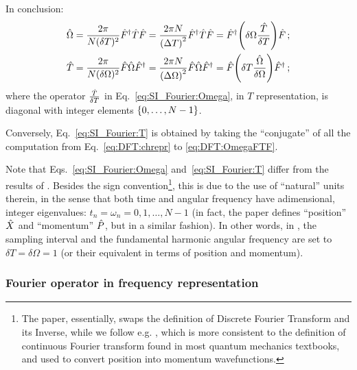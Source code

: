 In conclusion:
\begin{gather}
  \label{eq:SI_Fourier:Omega}
    \hat{\Omega} =
      \frac{2\pi}{N(\delta T)^2}          \hat{F}^{\dagger} \hat{T} \hat{F} =
      \frac{2\pi N}{\qty(\Delta T)^2}     \hat{F}^{\dagger} \hat{T} \hat{F} =
      \hat{F}^{\dagger} \qty(\delta{\Omega} \frac{\hat{T}}{\delta{T}}) \hat{F}
      \, \text{;}
      \\
  \label{eq:SI_Fourier:T}
    \hat{T} =
      \frac{2\pi}{N(\delta\Omega)^2}      \hat{F} \hat{\Omega} \hat{F}^{\dagger} =
      \frac{2\pi N}{\qty(\Delta\Omega)^2} \hat{F} \hat{\Omega} \hat{F}^{\dagger} =
      \hat{F} \qty(\delta{T} \frac{\hat{\Omega}}{\delta{\Omega}}) \hat{F}^{\dagger}
      \, \text{;}
\end{gather}
where the operator $\frac{\hat{T}}{\delta{T}}$ in Eq.~\eqref{eq:SI_Fourier:Omega},
in $T$ representation, is diagonal with integer elements $\left\{0, \dots, N-1\right\}$.

Conversely, Eq.~\eqref{eq:SI_Fourier:T} is obtained by
taking the ``conjugate'' of all the computation
from Eq.~\eqref{eq:DFT:chrepr} to \eqref{eq:DFT:OmegaFTF}.

Note that Eqs.~\eqref{eq:SI_Fourier:Omega} and~\eqref{eq:SI_Fourier:T}
differ from the results of \cite{FiniteHilb}.
Besides the sign convention\footnote{
  The paper, essentially, swaps the definition of Discrete Fourier Transform and its Inverse,
  while we follow e.g. \cite[Sec. 7.6]{Folland:Fourier},
  which is more consistent to the definition of continuous Fourier transform
  found in most quantum mechanics textbooks,
  and used to
  convert position into momentum wavefunctions.
},
this is due to the use of
``natural'' units therein,
in the sense that
both time and angular frequency
have adimensional, integer eigenvalues:
$t_n = \omega_n = 0, 1, \dots, N-1$
(in fact, the paper defines ``position'' $\hat{X}$ and ``momentum'' $\hat{P}$,
but in a similar fashion).
In other words, in \citereset\cite{FiniteHilb}, the sampling interval and the fundamental harmonic angular frequency
are set to $\delta{T} = \delta{\Omega} = 1$ (or their equivalent in terms of position and momentum).

\subsubsection{Fourier operator in frequency representation}


